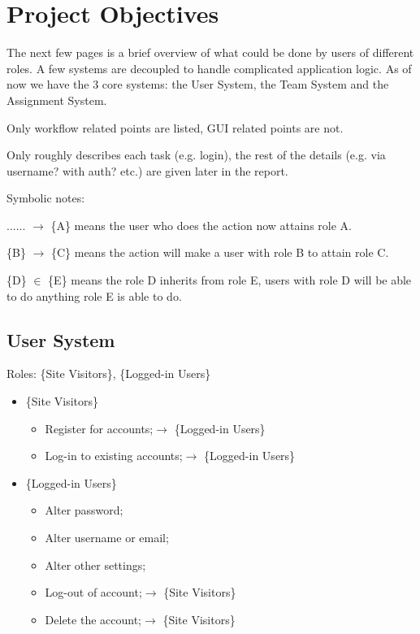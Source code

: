 \documentclass[12pt]{report}
\begin{document}
\section{Project Objectives} \label{overview.project-objectives}

The next few pages is a brief overview of what could be done by users of different roles.
A few systems are decoupled to handle complicated application logic.
As of now we have the 3 core systems: the User System, the Team System and the Assignment System.
\vspace{1 em}

Only workflow related points are listed, GUI related points are not.

Only roughly describes each task (e.g. login),
the rest of the details (e.g. via username? with auth? etc.) are given later in the report.
\vspace{1 em}

Symbolic notes:

...... $\rightarrow$ \{A\} means the user who does the action now attains role A.

\{B\} $\rightarrow$ \{C\} means the action will make a user with role B to attain role C.

\{D\} $\in$ \{E\} means the role D inherits from role E,
users with role D will be able to do anything role E is able to do.

\newpage
\subsection{User System} \label{overview.project-objectives.user-system}

Roles: \{Site Visitors\}, \{Logged-in Users\}

\begin{itemize}
	\item \{Site Visitors\}
	      \begin{itemize}
		      \item Register for accounts;\null\hfill $\rightarrow$ \{Logged-in Users\}
		      \item Log-in to existing accounts;\null\hfill $\rightarrow$ \{Logged-in Users\}
	      \end{itemize}
	\item \{Logged-in Users\}
	      \begin{itemize}
		      \item Alter password;
		      \item Alter username or email;
		      \item Alter other settings;
		      \item Log-out of account;\null\hfill $\rightarrow$ \{Site Visitors\}
		      \item Delete the account;\null\hfill $\rightarrow$ \{Site Visitors\}
	      \end{itemize}
\end{itemize}
\end{document}

